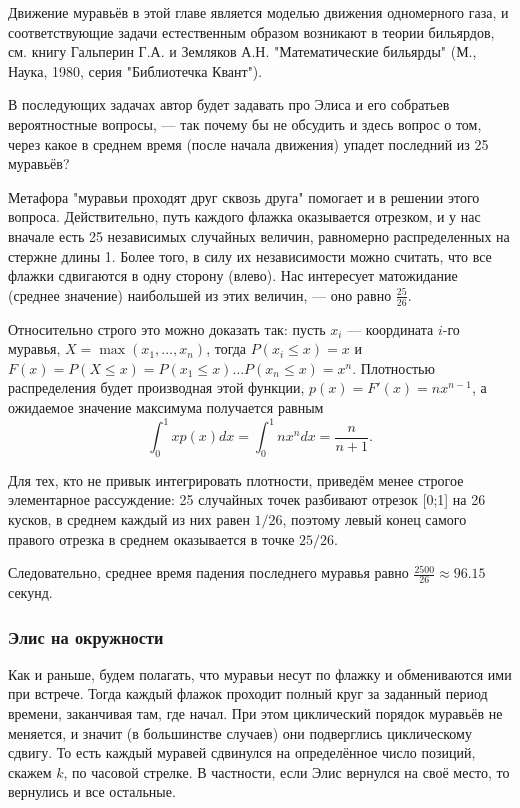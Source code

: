 \begin{addedbytheeditors}
Движение муравьёв в этой главе является моделью движения одномерного газа, и соответствующие задачи естественным образом возникают в теории бильярдов, см. книгу Гальперин Г.А. и Земляков А.Н. 
"Математические бильярды" (М., Наука, 1980, серия "Библиотечка Квант"). 

В последующих задачах автор будет задавать про Элиса и его собратьев вероятностные вопросы, --- так почему бы не обсудить и здесь вопрос о том, через какое в среднем время (после начала движения) упадет последний из 25 муравьёв?  

Метафора "муравьи проходят друг сквозь друга" помогает и в решении этого вопроса. Действительно, путь каждого флажка оказывается отрезком, и у нас вначале есть 25 независимых случайных величин, равномерно распределенных на стержне длины 1.
Более того, в силу их независимости можно считать, что все флажки сдвигаются в одну сторону (влево).
Нас интересует матожидание (среднее значение) наибольшей из этих величин, --- оно равно $\frac{25}{26}$.

Относительно строго это можно доказать так: пусть $x_i$ --- координата $i$-го муравья, $X=\max(x_1, \dots, x_n)$, тогда $P(x_i\le x)=x$ и $F(x)=P(X\le x)=P(x_1\le x)\ldots P(x_n\le x)=x^n$. Плотностью распределения будет производная этой функции, $p(x)=F'(x)=nx^{n-1}$, а ожидаемое значение максимума получается равным $$\int_0^1 x p(x) dx =  \int_0^1 nx^n dx = \frac{n}{n+1}.$$ 

Для тех, кто не привык интегрировать плотности, приведём менее строгое элементарное рассуждение: 25 случайных точек разбивают отрезок [0;1] на 26 кусков, в среднем каждый из них равен $1/26$, поэтому левый конец самого правого отрезка в среднем оказывается в точке $25/26$.

Следовательно, среднее время падения последнего муравья равно $\frac{2500}{26} \approx 96.15$ секунд. 
\end{addedbytheeditors}

\subsubsection*{Элис на окружности}

Как и раньше, будем полагать, что муравьи несут по флажку и обмениваются ими при встрече.
Тогда каждый флажок проходит полный круг за заданный период времени, заканчивая там, где начал.
При этом циклический порядок муравьёв не меняется, и значит (в большинстве случаев) они подверглись циклическому сдвигу.
То есть каждый муравей сдвинулся на определённое число позиций, скажем $k$, по часовой стрелке.
В частности, если Элис вернулся на своё место, то вернулись и все остальные.

